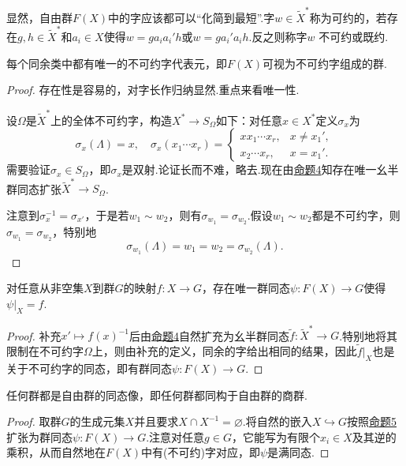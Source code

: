 显然，自由群$F(X)$中的字应该都可以“化简到最短”.字$w\in\widetilde{X}^*$称为{\heiti 可约的}，若存在$g,h\in\widetilde{X}^*$和$a_i\in X$使得$w=ga_ia_i'h$或$w=ga_i'a_ih$.反之则称字$w$ {\heiti 不可约}或{\heiti 既约}.
\begin{prop}
	每个同余类中都有唯一的不可约字代表元，即$F(X)$可视为不可约字组成的群.
\end{prop}
\begin{proof}
	存在性是容易的，对字长作归纳显然.重点来看唯一性.

	设$\Omega$是$\widetilde{X}^*$上的全体不可约字，构造$X^*\to S_\Omega$如下：对任意$x\in X^*$定义$\sigma_x$为
	\[
		\sigma_x(\Lambda)=x,\quad\sigma_x(x_1\cdots x_r)=\begin{cases}
			xx_1\cdots x_r, & x\ne x_1', \\
			x_2\cdots x_r,  & x=x_1'.
		\end{cases}
	\]
	需要验证$\sigma_x\in S_\Omega$，即$\sigma_x$是双射.论证长而不难，略去.现在由\hyperlink{prop:MonoidExtension}{命题4}知存在唯一幺半群同态扩张$\widetilde{X}^*\to S_\Omega$.

	注意到$\sigma_x^{-1}=\sigma_{x'}$，于是若$w_1\sim w_2$，则有$\sigma_{w_1}=\sigma_{w_2}$.假设$w_1\sim w_2$都是不可约字，则$\sigma_{w_1}=\sigma_{w_2}$，特别地
	\[
		\sigma_{w_1}(\Lambda)=w_1=w_2=\sigma_{w_2}(\Lambda).
	\]
\end{proof}
\begin{prop}
	对任意从非空集$X$到群$G$的映射$f\colon X\to G$，存在唯一群同态$\psi\colon F(X)\to G$使得$\psi|_X=f$.\hypertarget{prop:FreeGroupExtension}{}
\end{prop}
\begin{proof}
	补充$x'\mapsto f(x)^{-1}$后由\hyperlink{prop:MonoidExtension}{命题4}自然扩充为幺半群同态$\tilde{f}\colon\widetilde{X}^*\to G$.特别地将其限制在不可约字$\Omega$上，则由补充的定义，同余的字给出相同的结果，因此$\tilde{f}|_X$也是关于不可约字的同态，即有群同态$\psi\colon F(X)\to G$.
\end{proof}
\begin{thm}
	任何群都是自由群的同态像，即任何群都同构于自由群的商群.
\end{thm}
\begin{proof}
	取群$G$的生成元集$X$并且要求$X\cap X^{-1}=\varnothing$.将自然的嵌入$X\hookrightarrow G$按照\hyperlink{prop:FreeGroupExtension}{命题5}扩张为群同态$\psi\colon F(X)\to G$.注意对任意$g\in G$，它能写为有限个$x_i\in X$及其逆的乘积，从而自然地在$F(X)$中有(不可约)字对应，即$\psi$是满同态.
\end{proof}

